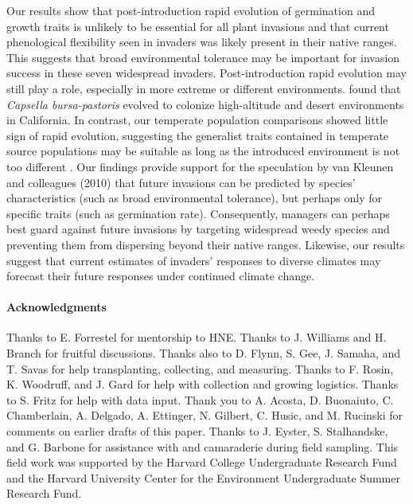 \documentclass[11pt]{article}\usepackage[]{graphicx}\usepackage[]{color}
\begin{document}
	Our results show that post-introduction rapid evolution of germination and growth traits is unlikely to be essential for all plant invasions and that current phenological flexibility seen in invaders was likely present in their native ranges. This suggests that broad environmental tolerance may be important for invasion success in these seven widespread invaders. Post-introduction rapid evolution may still play a role, especially in more extreme or different environments.  \textcite{Linde2001} found that \textit{Capsella bursa-pastoris} evolved to colonize high-altitude and desert environments in California. In contrast, our temperate population comparisons showed little sign of rapid evolution, suggesting the generalist traits contained in temperate source populations may be suitable as long as the introduced environment is not too different \parencite{Baker1965}. Our findings provide support for  the speculation by van Kleunen and colleagues (2010) that future invasions can be predicted by species' characteristics (such as broad environmental tolerance), but perhaps only for specific traits (such as germination rate). Consequently, managers can perhaps best guard against future invasions by targeting widespread weedy species and preventing them from dispersing beyond their native ranges. Likewise, our results suggest that current estimates of invaders' responses to diverse climates may forecast their future responses under continued climate change. 
	
\paragraph{Acknowledgments}
Thanks to E. Forrestel for mentorship to HNE. Thanks to J. Williams and H. Branch for fruitful discussions. Thanks also to D. Flynn, S. Gee, J. Samaha, and T. Savas for help transplanting, collecting, and measuring. Thanks to F. Rosin, K. Woodruff, and J. Gard for help with collection and growing logistics. Thanks to S. Fritz for help with data input. Thank you to A. Acosta, D. Buonaiuto, C. Chamberlain, A. Delgado, A. Ettinger, N. Gilbert, C. Husic, and M. Rucinski for comments on earlier drafts of this paper. Thanks to J. Eyster, S. Stalhandske, and G. Barbone for assistance with and camaraderie during field sampling. This field work was supported by the Harvard College Undergraduate Research Fund and the Harvard University Center for the Environment Undergraduate Summer Research Fund. %
\end{document}
